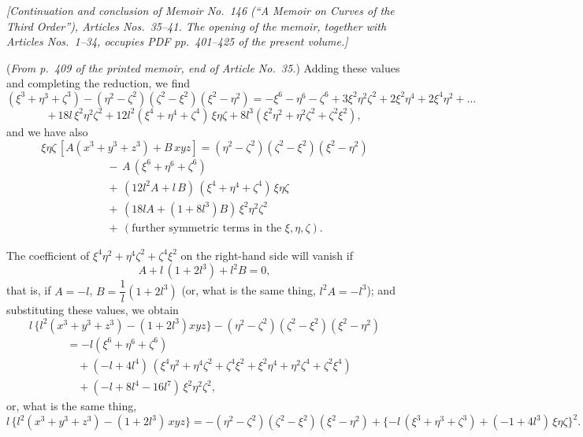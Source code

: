 \documentclass[11pt]{article}
\begin{document}
%
%

\noindent\textit{[Continuation and conclusion of Memoir No.~146 (``A Memoir on Curves of the Third Order''), Articles Nos.~35--41. The opening of the memoir, together with Articles Nos.~1--34, occupies PDF pp.~401--425 of the present volume.]}

\bigskip

\noindent (\textit{From p.~409 of the printed memoir, end of Article No.~35.}) Adding these values and completing the reduction, we find
\[
(\xi^3 + \eta^3 + \zeta^3) - (\eta^2 - \zeta^2)(\zeta^2 - \xi^2)(\xi^2 - \eta^2) = - \xi^6 - \eta^6 - \zeta^6 + 3 \xi^2 \eta^2 \zeta^2 + 2 \xi^2 \eta^4 + 2 \xi^4 \eta^2 + \ldots
\]
\[
+\, 18 l\,\xi^2 \eta^2 \zeta^2 + 12 l^2 (\xi^4 + \eta^4 + \zeta^4)\,\xi\eta\zeta + 8 l^3 (\xi^2 \eta^2 + \eta^2 \zeta^2 + \zeta^2 \xi^2),
\]
and we have also
\[
\xi\eta\zeta \,[A(x^3 + y^3 + z^3) + B\, xyz] = (\eta^2 - \zeta^2)(\zeta^2 - \xi^2)(\xi^2 - \eta^2)
\]
\begin{align*}
&\quad -\, A\,(\xi^6 + \eta^6 + \zeta^6) \\
&\quad +\, (12 l^2 A + l\, B)\,(\xi^4 + \eta^4 + \zeta^4)\,\xi\eta\zeta \\
&\quad +\, (18 l A + (1 + 8 l^3) B)\,\xi^2 \eta^2 \zeta^2 \\
&\quad +\, (\text{further symmetric terms in the } \xi, \eta, \zeta).
\end{align*}

The coefficient of $\xi^4 \eta^2 + \eta^4 \zeta^2 + \zeta^4 \xi^2$ on the right-hand side will vanish if
\[
A + l\,(1 + 2 l^3) + l^2 B = 0,
\]
that is, if $A = -l$, $B = \dfrac{1}{l}(1 + 2 l^3)$ (or, what is the same thing, $l^2 A = -l^3$); and substituting these values, we obtain
\[
l\,\{l^2 (x^3 + y^3 + z^3) - (1 + 2 l^3) xyz\} - (\eta^2 - \zeta^2)(\zeta^2 - \xi^2)(\xi^2 - \eta^2)
\]
\begin{align*}
&= -l (\xi^6 + \eta^6 + \zeta^6) \\
&\quad + (-l + 4 l^4)\,(\xi^4 \eta^2 + \eta^4 \zeta^2 + \zeta^4 \xi^2 + \xi^2 \eta^4 + \eta^2 \zeta^4 + \zeta^2 \xi^4) \\
&\quad + (-l + 8 l^4 - 16 l^7)\,\xi^2 \eta^2 \zeta^2,
\end{align*}
or, what is the same thing,
\[
l\,\{l^2 (x^3 + y^3 + z^3) - (1 + 2 l^3)\, xyz\} = -(\eta^2 - \zeta^2)(\zeta^2 - \xi^2)(\xi^2 - \eta^2) + \{-l\,(\xi^3 + \eta^3 + \zeta^3) + (-1 + 4 l^3)\,\xi\eta\zeta\}^2.
\]
\end{document}
